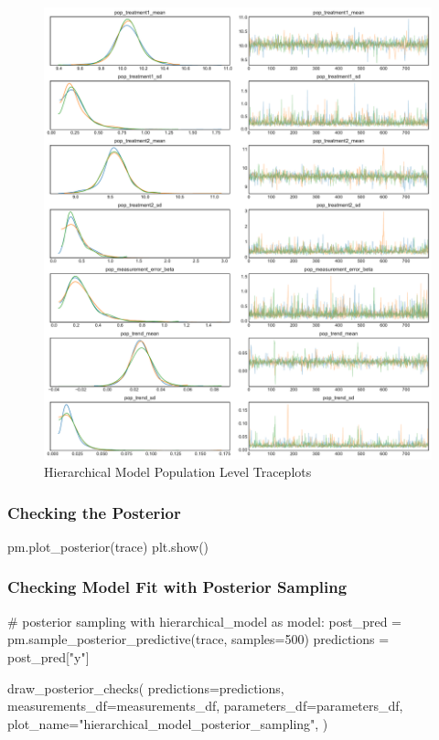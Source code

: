\documentclass[12pt,a4paper,leqno]{report}
\theoremstyle{plain}
\theoremstyle{definition}
\theoremstyle{remark}
\begin{document}
\begin{figure}[!h]
    \caption{Hierarchical Model Population Level Traceplots}
    \includegraphics[width=\textwidth,height=\textheight,keepaspectratio]{hierarchical_model_population_level_traceplot.pdf}
\end{figure}



\subsubsection{Checking the Posterior}
\bigskip
\begin{pyverbatim}
    pm.plot_posterior(trace)
    plt.show()
\end{pyverbatim}
\bigskip

\subsubsection{Checking Model Fit with Posterior Sampling}
\bigskip
\begin{pyverbatim}
# posterior sampling
with hierarchical_model as model:
    post_pred = pm.sample_posterior_predictive(trace, samples=500)
    predictions = post_pred["y"]

draw_posterior_checks(
    predictions=predictions,
    measurements_df=measurements_df,
    parameters_df=parameters_df,
    plot_name="hierarchical_model_posterior_sampling",
)
\end{pyverbatim}
\bigskip
\end{document}
